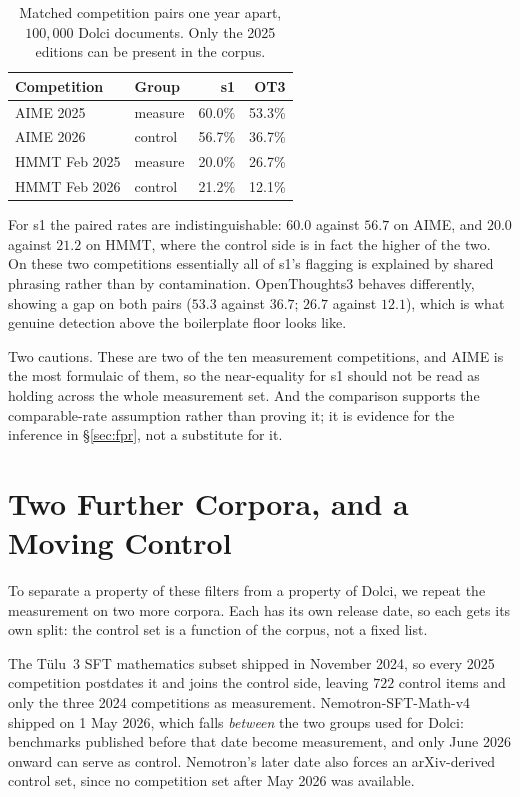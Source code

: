 \documentclass[11pt]{article}
\begin{document}
\begin{table}[h]
\centering
\small
\setlength{\tabcolsep}{4pt}
\begin{tabular}{llrr}
\toprule
\textbf{Competition} & \textbf{Group} & \textbf{s1} & \textbf{OT3} \\
\midrule
AIME 2025     & measure & 60.0\% & 53.3\% \\
AIME 2026     & control & 56.7\% & 36.7\% \\
HMMT Feb 2025 & measure & 20.0\% & 26.7\% \\
HMMT Feb 2026 & control & 21.2\% & 12.1\% \\
\bottomrule
\end{tabular}
\caption{Matched competition pairs one year apart, $100{,}000$ Dolci documents.
Only the 2025 editions can be present in the corpus.}
\label{tab:matched}
\end{table}

For s1 the paired rates are indistinguishable: $60.0$ against $56.7$ on AIME, and
$20.0$ against $21.2$ on HMMT, where the control side is in fact the higher of the
two. On these two competitions essentially all of s1's flagging is explained by
shared phrasing rather than by contamination. OpenThoughts3 behaves differently,
showing a gap on both pairs ($53.3$ against $36.7$; $26.7$ against $12.1$), which
is what genuine detection above the boilerplate floor looks like.

Two cautions. These are two of the ten measurement competitions, and AIME is the
most formulaic of them, so the near-equality for s1 should not be read as holding
across the whole measurement set. And the comparison supports the comparable-rate
assumption rather than proving it; it is evidence for the inference in
\S\ref{sec:fpr}, not a substitute for it.

\section{Two Further Corpora, and a Moving Control}
\label{sec:nemotron}
\label{sec:second}

To separate a property of these filters from a property of Dolci, we repeat the
measurement on two more corpora. Each has its own release date, so each gets its
own split: the control set is a function of the corpus, not a fixed list.

The T\"{u}lu~3 SFT mathematics subset shipped in November 2024, so every 2025
competition postdates it and joins the control side, leaving $722$ control items
and only the three 2024 competitions as measurement. Nemotron-SFT-Math-v4 shipped
on 1 May 2026, which falls \emph{between} the two groups used for Dolci:
benchmarks published before that date become measurement, and only June 2026
onward can serve as control. Nemotron's later date also forces an arXiv-derived
control set, since no competition set after May 2026 was available.
\end{document}
